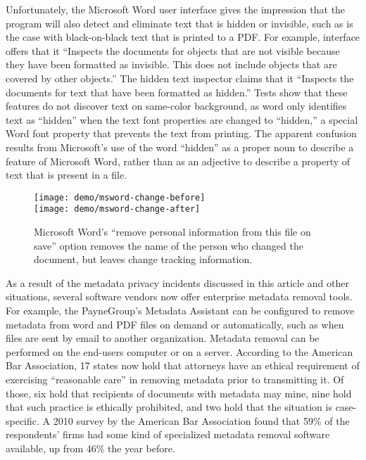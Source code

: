 \documentclass{article}
\begin{document}
Unfortunately, the Microsoft Word user interface gives the impression
that the program will also detect and eliminate text that is hidden or
invisible, such as is the case with black-on-black text that is
printed to a PDF. For example, interface offers that it 
``Inspects the documents for objects that are not visible because they
have been formatted as invisible. This does not include objects that
are covered by other objects.'' The hidden text inspector claims that
it ``Inspects the documents for text that have been formatted as
hidden.''  Tests show that these features do
not discover text on same-color background, as word only identifies text as ``hidden'' when the
text font properties are changed to ``hidden,'' a special Word font
property that prevents the text from printing. The apparent confusion results
from Microsoft's use of the word ``hidden'' as a proper noun to
describe a feature of Microsoft Word, rather than as an adjective to
describe a property of text that is present in a file.

\begin{figure}
\texttt{[image: demo/msword-change-before]}\\
\texttt{[image: demo/msword-change-after]}\\
\caption{Microsoft Word's ``remove personal information from this file
  on save'' option removes the name of the person who changed the
  document, but leaves change tracking information.}\label{msword-remove-demo}
\end{figure}



As a result of the metadata privacy incidents discussed in this
article and other situations, several software vendors now offer
enterprise metadata removal tools. For example, the PayneGroup's
Metadata Assistant can be configured to remove metadata from word and
PDF files on demand or automatically, such as
when files are sent by email to another organization. Metadata removal
can be performed on the end-users computer or on a server. According
to the American Bar Association, 17 states now hold that attorneys
have an ethical requirement of exercising ``reasonable care'' in
removing metadata prior to transmitting it\cite{aba-survey}. Of those,
six hold that recipients of documents with metadata may mine,  nine
hold that such practice is ethically prohibited, and two hold that the
situation is case-specific. A 2010 survey by the American Bar
Association found that 59\% of the respondents' firms had some kind of
specialized metadata removal software available, up from 46\% the year
before.
\end{document}
